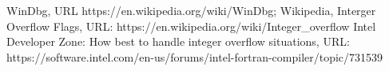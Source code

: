     \begin{thebibliography}{00}
         WinDbg, URL https://en.wikipedia.org/wiki/WinDbg;
         Wikipedia, Interger Overflow Flags, URL: https://en.wikipedia.org/wiki/Integer\_overflow
         Intel Developer Zone: How best to handle integer overflow situations, URL: https://software.intel.com/en-us/forums/intel-fortran-compiler/topic/731539
    \end{thebibliography}

